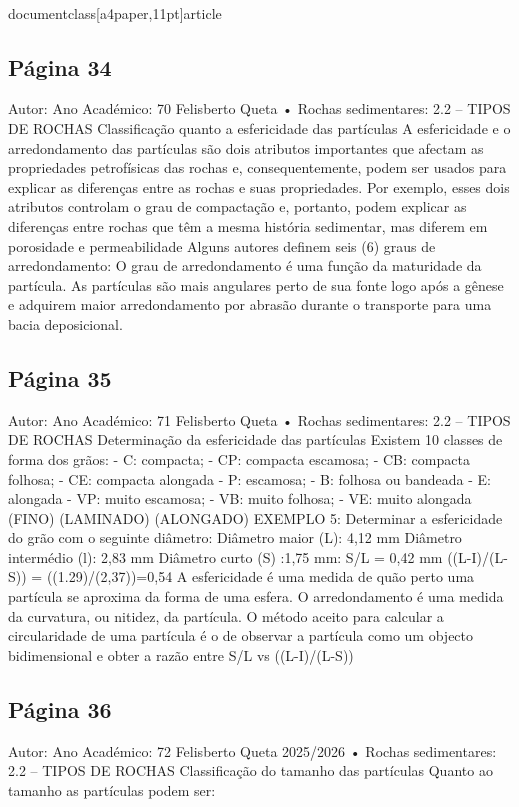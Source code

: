 \\documentclass[a4paper,11pt]{article}
\begin{document}
\subsection*{Página 34}
Autor:
Ano Académico:
70
Felisberto Queta
•
Rochas sedimentares: 
2.2 – TIPOS DE ROCHAS
Classificação quanto a esfericidade das partículas 
A esfericidade e o arredondamento das partículas são dois atributos importantes que afectam as
propriedades petrofísicas das rochas e, consequentemente, podem ser usados ​para explicar as
diferenças entre as rochas e suas propriedades. Por exemplo, esses dois atributos controlam o grau
de compactação e, portanto, podem explicar as diferenças entre rochas que têm a mesma história
sedimentar, mas diferem em porosidade e permeabilidade
Alguns autores definem seis (6) graus de arredondamento:
O grau de arredondamento é uma função da maturidade da partícula. As partículas são mais 
angulares perto de sua fonte logo após a gênese e adquirem maior arredondamento por abrasão 
durante o transporte para uma bacia deposicional.



\subsection*{Página 35}
Autor:
Ano Académico:
71
Felisberto Queta
•
Rochas sedimentares: 
2.2 – TIPOS DE ROCHAS
Determinação da esfericidade das partículas  
Existem
10
classes
de
forma dos grãos:
- C: compacta;
- CP: compacta escamosa;
- CB: compacta folhosa;
- CE: compacta alongada
- P: escamosa;
- B: folhosa ou bandeada
- E: alongada
-
VP: muito escamosa;
- VB: muito folhosa;
- VE: muito alongada
(FINO)
(LAMINADO)
(ALONGADO)
EXEMPLO 5:
Determinar a 
esfericidade do grão 
com o seguinte 
diâmetro:
Diâmetro maior (L): 
4,12 mm
Diâmetro intermédio 
(l): 2,83 mm 
Diâmetro curto (S)
:1,75 mm:
S/L = 0,42 mm
((L-I)/(L-S)) = ((1.29)/(2,37))=0,54
A esfericidade é uma medida de quão perto
uma partícula se aproxima da forma de uma
esfera. O arredondamento é uma medida da
curvatura, ou nitidez, da partícula. O método
aceito para calcular a circularidade de uma
partícula é o de observar a partícula como um
objecto bidimensional e obter a razão entre
S/L vs ((L-I)/(L-S))



\subsection*{Página 36}
Autor:
Ano Académico:
72
Felisberto Queta
2025/2026
•
Rochas sedimentares: 
2.2 – TIPOS DE ROCHAS
Classificação do tamanho das partículas
Quanto ao tamanho as partículas podem ser:
\end{document}
